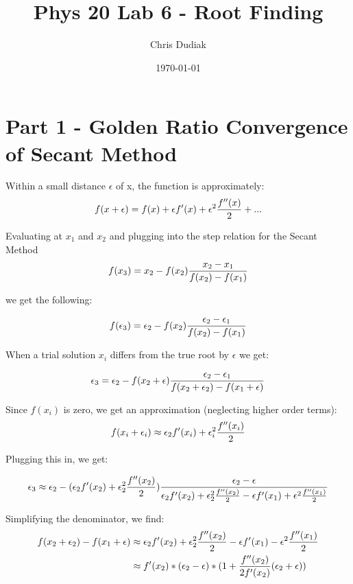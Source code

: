 \documentclass{article}
\begin{document}
\title{Phys 20 Lab 6 - Root Finding}
\author{Chris Dudiak}
\date{\today}
\maketitle

\section{Part 1 - Golden Ratio Convergence of Secant Method}

Within a small distance $\epsilon$ of x, the function is approximately:
\begin{align*}
	f(x + \epsilon) = f(x) + \epsilon f'(x) + \epsilon^2 {f''(x) \over 2} + ...
\end{align*}

Evaluating at $x_1$ and $x_2$ and plugging into the step relation for the Secant Method
\begin{align*}
	f(x_3) = x_2 - f(x_2) {x_2 - x_1 \over f(x_2) - f(x_1)}
\end{align*}

we get the following:

\begin{align*}
	f(\epsilon_3) = \epsilon_2 - f(x_2) {\epsilon_2 - \epsilon_1 \over f(x_2) - f(x_1)}
\end{align*}

When a trial solution $x_i$ differs from the true root by $\epsilon$ we get:

\begin{align*}
	\epsilon_3 = \epsilon_2 - f(x_2 + \epsilon) {\epsilon_2 - \epsilon_1 \over f(x_2 + \epsilon_2) - f(x_1 + \epsilon)}
\end{align*}

Since $f(x_i)$ is zero, we get an approximation (neglecting higher order terms):
\begin{align*}
	f(x_i + \epsilon_i) \approx  \epsilon_2 f'(x_i) + \epsilon_i^2 {f''(x_i) \over 2} 
\end{align*}

Plugging this in, we get:

\begin{align*}
	\epsilon_3 \approx \epsilon_2 - (\epsilon_2 f'(x_2) + \epsilon_2^2 {f''(x_2) \over 2})  {\epsilon_2 - \epsilon \over \epsilon_2 f'(x_2) + \epsilon_2^2 
	{f''(x_2)  \over 2}  - \epsilon f'(x_1) + \epsilon^2 {f''(x_1) \over 2} }
\end{align*}

Simplifying the denominator, we find:
\begin{align*}
	f(x_2 + \epsilon_2) - f(x_1 + \epsilon) &\approx \epsilon_2 f'(x_2) + \epsilon_2^2 {f''(x_2)  \over 2}  - \epsilon f'(x_1) - \epsilon^2 {f''(x_1) \over 2} \\
	&\approx f'(x_2) * (\epsilon_2 - \epsilon) * (1 + {f''(x_2) \over 2f'(x_2)} (\epsilon_2 + \epsilon))
\end{align*}
\end{document}
